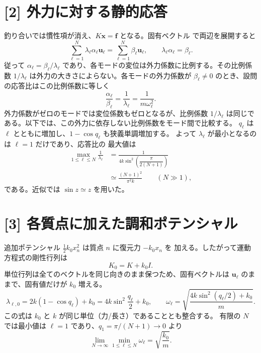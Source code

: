 \documentclass[11pt,a4paper]{article}
\begin{document}
\section*{[2] 外力に対する静的応答}
釣り合いでは慣性項が消え、$K\boldsymbol{x}=\boldsymbol{f}$ となる。固有ベクトル
で両辺を展開すると
\begin{equation}
  \sum_{\ell=1}^{N}\lambda_\ell\alpha_\ell\boldsymbol{u}_\ell
  =\sum_{\ell=1}^{N}\beta_\ell\boldsymbol{u}_\ell,
  \qquad
  \lambda_\ell\alpha_\ell=\beta_\ell.
\end{equation}
従って $\alpha_\ell=\beta_\ell/\lambda_\ell$ であり、各モードの変位は外力係数に比例する。その比例係数 $1/\lambda_\ell$ は外力の大きさによらない。各モードの外力係数が $\beta_\ell\ne0$ のとき、設問の応答比はこの比例係数に等しく
\begin{equation}
  \frac{\alpha_\ell}{\beta_\ell}
  =\frac{1}{\lambda_\ell}
  =\frac{1}{m\omega_\ell^2}.
  \label{eq:response}
\end{equation}
外力係数がゼロのモードでは変位係数もゼロとなるが、比例係数 $1/\lambda_\ell$ は同じである。以下では、この外力に依存しない比例係数をモード間で比較する。
$q_\ell$ は $\ell$ とともに増加し、$1-\cos q_\ell$ も狭義単調増加する。
よって $\lambda_\ell$ が最小となるのは $\ell=1$ だけであり、応答比の
最大値は
\begin{align}
 \max_{1\le\ell\le N}\frac{1}{\lambda_\ell}
 &=\frac{1}{4k\sin^2\!\left(\dfrac{\pi}{2(N+1)}\right)}\\
 &\simeq\frac{(N+1)^2}{\pi^2k}\qquad(N\gg1),
 \label{eq:max-response}
\end{align}
である。近似では $\sin z\simeq z$ を用いた。

\section*{[3] 各質点に加えた調和ポテンシャル}
追加ポテンシャル $\tfrac12 k_0x_n^2$ は質点 $n$ に復元力 $-k_0x_n$ を
加える。したがって運動方程式の剛性行列は
\begin{equation}
  K_{0}=K+k_0I.
\end{equation}
単位行列は全てのベクトルを同じ向きのまま保つため、固有ベクトルは
$\boldsymbol{u}_\ell$ のままで、固有値だけが $k_0$ 増える。
\begin{equation}
  \lambda_{\ell,0}=2k(1-\cos q_\ell)+k_0
  =4k\sin^2\frac{q_\ell}{2}+k_0,
  \qquad
  \omega_\ell=\sqrt{\frac{4k\sin^2(q_\ell/2)+k_0}{m}}.
  \label{eq:pinned-omega}
\end{equation}
この式は $k_0$ と $k$ が同じ単位（力/長さ）であることとも整合する。
有限の $N$ では最小値は $\ell=1$ であり、$q_1=\pi/(N+1)\to0$ より
\begin{equation}
  \lim_{N\to\infty}\min_{1\le\ell\le N}\omega_\ell
  =\sqrt{\frac{k_0}{m}}.
\end{equation}
\end{document}
